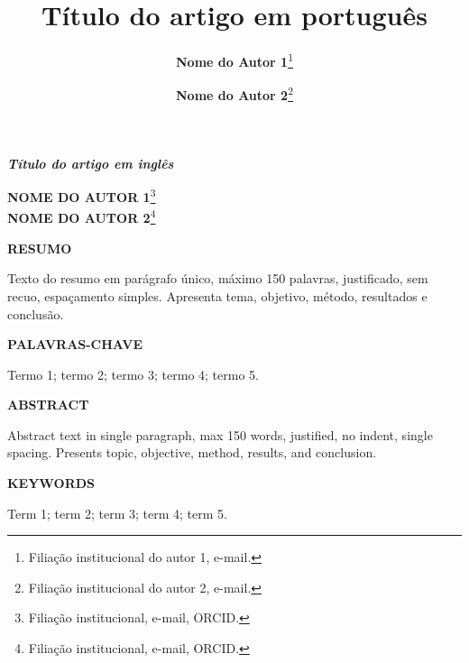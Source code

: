 \documentclass[
    article,        %
    12pt,
    a4paper,
    oneside,        %
    brazil,
    sumario=tradicional
]{abntex2}
\title{Título do artigo em português}
\author{
    \textbf{Nome do Autor 1}\thanks{Filiação institucional do autor 1, e-mail.}
    \and
    \textbf{Nome do Autor 2}\thanks{Filiação institucional do autor 2, e-mail.}
}
\date{}    %
\begin{document}
\frenchspacing

\begin{center}
\textbf{\thetitle}
\end{center}

\vspace{1ex}

\begin{center}
\textit{\textbf{Título do artigo em inglês}}
\end{center}

\vspace{1ex}

\begin{flushright}
\MakeUppercase{\textbf{Nome do Autor 1}}\footnote{Filiação institucional, e-mail, ORCID.}\\
\MakeUppercase{\textbf{Nome do Autor 2}}\footnote{Filiação institucional, e-mail, ORCID.}
\end{flushright}

\vspace{2ex}

\noindent\textbf{RESUMO}

\noindent
Texto do resumo em parágrafo único, máximo 150 palavras, justificado, sem recuo, espaçamento simples. Apresenta tema, objetivo, método, resultados e conclusão.

\vspace{1ex}

\noindent\textbf{PALAVRAS-CHAVE}

\noindent
Termo 1; termo 2; termo 3; termo 4; termo 5.

\vspace{1ex}

\noindent\textbf{ABSTRACT}

\noindent
Abstract text in single paragraph, max 150 words, justified, no indent, single spacing. Presents topic, objective, method, results, and conclusion.

\vspace{1ex}

\noindent\textbf{KEYWORDS}

\noindent
Term 1; term 2; term 3; term 4; term 5.

\vspace{2ex}
\end{document}
